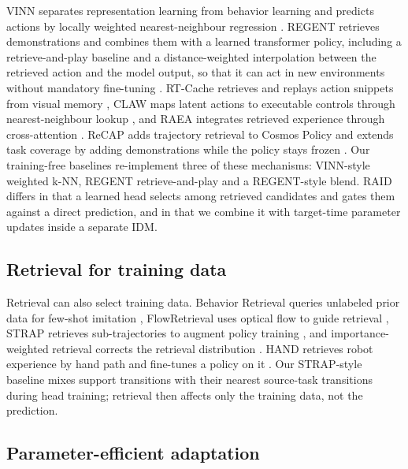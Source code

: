 \documentclass[11pt,a4paper]{article}
\begin{document}
VINN separates representation learning from behavior learning and predicts actions by locally weighted nearest-neighbour regression \cite{ref6}. REGENT retrieves demonstrations and combines them with a learned transformer policy, including a retrieve-and-play baseline and a distance-weighted interpolation between the retrieved action and the model output, so that it can act in new environments without mandatory fine-tuning \cite{ref7}. RT-Cache retrieves and replays action snippets from visual memory \cite{ref28}, CLAW maps latent actions to executable controls through nearest-neighbour lookup \cite{ref29}, and RAEA integrates retrieved experience through cross-attention \cite{ref30}. ReCAP adds trajectory retrieval to Cosmos Policy and extends task coverage by adding demonstrations while the policy stays frozen \cite{ref16}. Our training-free baselines re-implement three of these mechanisms: VINN-style weighted k-NN, REGENT retrieve-and-play and a REGENT-style blend. RAID differs in that a learned head selects among retrieved candidates and gates them against a direct prediction, and in that we combine it with target-time parameter updates inside a separate IDM.

\subsection{Retrieval for training data}

Retrieval can also select training data. Behavior Retrieval queries unlabeled prior data for few-shot imitation \cite{ref8}, FlowRetrieval uses optical flow to guide retrieval \cite{ref31}, STRAP retrieves sub-trajectories to augment policy training \cite{ref9}, and importance-weighted retrieval corrects the retrieval distribution \cite{ref32}. HAND retrieves robot experience by hand path and fine-tunes a policy on it \cite{ref17}. Our STRAP-style baseline mixes support transitions with their nearest source-task transitions during head training; retrieval then affects only the training data, not the prediction.

\subsection{Parameter-efficient adaptation}
\end{document}
